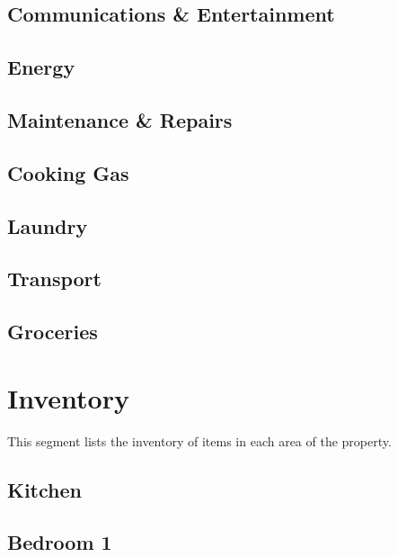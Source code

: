 \documentclass[letterpaper,10pt,openany,oneside,russian]{sphinxmanual}
\begin{document}
\subsection{Communications \& Entertainment}
\label{\detokenize{categories:communications-entertainment}}

\subsection{Energy}
\label{\detokenize{categories:energy}}

\subsection{Maintenance \& Repairs}
\label{\detokenize{categories:maintenance-repairs}}

\subsection{Cooking Gas}
\label{\detokenize{categories:cooking-gas}}

\subsection{Laundry}
\label{\detokenize{categories:laundry}}

\subsection{Transport}
\label{\detokenize{categories:transport}}

\subsection{Groceries}
\label{\detokenize{categories:groceries}}

\section{Inventory}
\label{\detokenize{categories:inventory}}
\sphinxAtStartPar
This segment lists the inventory of items in each area of the property.


\subsection{Kitchen}
\label{\detokenize{categories:kitchen}}

\subsection{Bedroom 1}
\label{\detokenize{categories:bedroom-1}}
\end{document}
